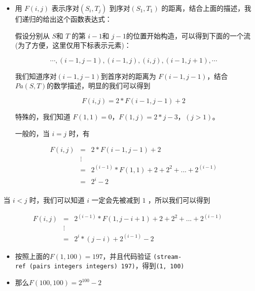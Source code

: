 \documentclass[]{article}
\begin{document}
\begin{itemize}
\item
  用 \(F(i, j)\) 表示序对\( (S_i, T_j)\) 到序对\( (S_1, T_1)\)
  的距离，结合上面的描述，我们递归的给出这个函数表达式：

   假设分别从 \(S \)和 \(T\) 的第 \(i-1 \)和
  \(j-1 \)的位置开始构造，可以得到下面的一个流(为了方便，这里仅用下标表示元素)：

  \[\cdots, (i-1, j-1), (i-1, j), (i, j), (i-1, j+1), \cdots\]

   我们知道序对\( (i-1, j-1) \)到首序对的距离为
  \(F(i-1, j-1)\)，结合\(Pa(S, T)\)的数学描述，明显的我们可以得到

  \[F(i ,j) = 2 * F(i-1, j-1) + 2\]

  特殊的，我们知道 \(F(1, 1) = 0，F(1, j) = 2 * j - 3，(j > 1)\)。

  一般的，当 \( i = j\) 时，有

  \begin{eqnarray*}
  F(i ,j) &=& 2 * F(i-1, j-1) + 2\\
  &\vdots&\\
  \         &=& 2^{(i-1)}*F(1, 1) + 2 + 2^2 + ... + 2^{(i-1)}\\
  &=& 2^i - 2\\
  \end{eqnarray*}
\end{itemize}

 当 \( i < j\) 时，我们可以知道 \( i \) 一定会先被减到 \(1\)
，所以我们可以得到

\begin{eqnarray*}
  F(i ,j) &=& 2^{(i-1)}*F(1, j-i+1) + 2 + 2^2 + ... + 2^{(i-1)}\\
  &\vdots&\\
  &=& 2^i * (j-i) + 2^{(i-1)}-2
  \end{eqnarray*}

\begin{itemize}
\item
  按照上面的\(F(1, 100) = 197\)，并且代码验证
  \texttt{(stream-ref\ (pairs\ integers\ integers)\ 197)}，得到\texttt{(1,\ 100)}
\item
  那么\(F(100, 100) = 2^{100} - 2\)
\end{itemize}
\end{document}
